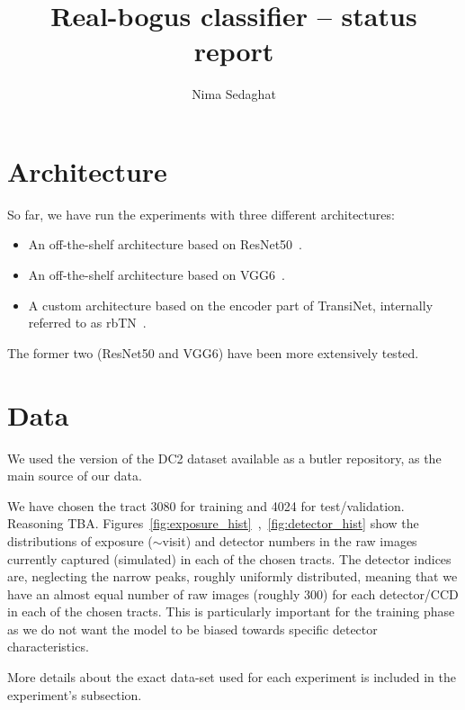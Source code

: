 \documentclass[DM,authoryear,toc]{lsstdoc}
\title{Real-bogus classifier -- status report}
\author{%
Nima Sedaghat
}
\date{\vcsDate}
\begin{document}
\maketitle


\section{Architecture}
So far, we have run the experiments with three different architectures:

\begin{itemize}
\item{An off-the-shelf architecture based on ResNet50~\citep{he2016deep}.}
\item{An off-the-shelf architecture based on VGG6~\citep{simonyan2014very}.}
\item{A custom architecture based on the encoder part of TransiNet, internally referred to as rbTN~\citep{sedaghat2018effective}.}
\end{itemize}

The former two (ResNet50 and VGG6) have been more extensively tested.

\section{Data}
We used the version of the DC2 dataset available as a butler repository, as the main source of our data.

We have chosen the tract 3080 for training and 4024 for test/validation. Reasoning TBA.
Figures~\ref{fig:exposure_hist}~,~\ref{fig:detector_hist} show the distributions of exposure ($\sim$visit) and detector numbers in the raw images currently captured (simulated) in each of the chosen tracts. The detector indices are, neglecting the narrow peaks, roughly uniformly distributed, meaning that we have an almost equal number of raw images (roughly 300) for each detector/CCD in each of the chosen tracts. This is particularly important for the training phase as we do not want the model to be biased towards specific detector characteristics.

More details about the exact data-set used for each experiment is included in the experiment's subsection.
\end{document}
